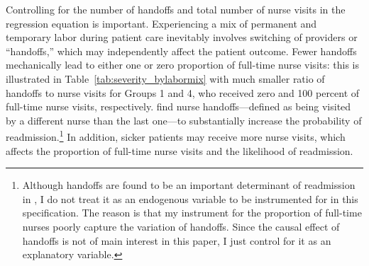\documentclass[final,12pt]{article}
\begin{document}
Controlling for the number of handoffs and total number of nurse visits in the regression equation is important.
Experiencing a mix of permanent and temporary labor during patient care inevitably involves switching of providers or ``handoffs,'' which may independently affect the patient outcome.
Fewer handoffs mechanically lead to either one or zero proportion of full-time nurse visits: this is illustrated in Table~\ref{tab:severity_bylabormix} with much smaller ratio of handoffs to nurse visits for Groups 1 and 4, who received zero and 100 percent of full-time nurse visits, respectively.
\citep{David2017} find nurse handoffs---defined as being visited by a different nurse than the last one---to substantially increase the probability of readmission.\footnote{Although handoffs are found to be an important determinant of readmission in \citep{David2017}, I do not treat it as an endogenous variable to be instrumented for in this specification. The reason is that my instrument for the proportion of full-time nurses poorly capture the variation of handoffs. Since the causal effect of handoffs is not of main interest in this paper, I just control for it as an explanatory variable.}
In addition, sicker patients may receive more nurse visits, which affects the proportion of full-time nurse visits and the likelihood of readmission.



%
\end{document}
